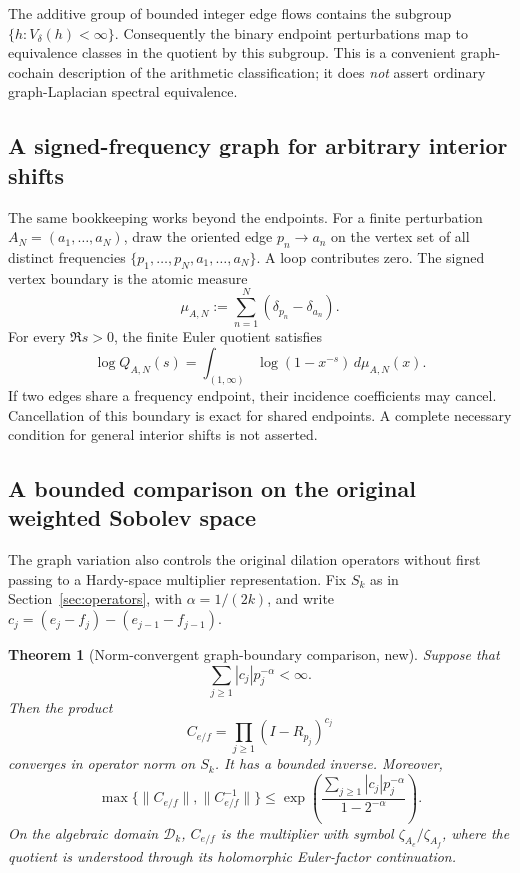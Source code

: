 \documentclass[12pt,letterpaper]{article}
\newtheorem{theorem}{Theorem}[section]
\theoremstyle{definition}
\theoremstyle{remark}
\begin{document}
The additive group of bounded integer edge flows contains the subgroup
\(\{h:V_\delta(h)<\infty\}\).
Consequently the binary endpoint perturbations map to equivalence
classes in the quotient by this subgroup.  This is a convenient
graph-cochain description of the arithmetic classification; it does
\emph{not} assert ordinary graph-Laplacian spectral equivalence.

\subsection{A signed-frequency graph for arbitrary interior shifts}

The same bookkeeping works beyond the endpoints.  For a finite
perturbation \(A_N=(a_1,\ldots,a_N)\), draw the oriented edge
\(p_n\to a_n\) on the vertex set of all distinct frequencies
\(\{p_1,\ldots,p_N,a_1,\ldots,a_N\}\).  A loop contributes zero.
The signed vertex boundary is the atomic measure
\[
 \mu_{A,N}:=\sum_{n=1}^N(\delta_{p_n}-\delta_{a_n}).
\]
For every \(\Re s>0\), the finite Euler quotient satisfies
\begin{equation}\label{eq:graph-atomic}
 \log Q_{A,N}(s)=
 \int_{(1,\infty)}\log(1-x^{-s})\,d\mu_{A,N}(x).
\end{equation}
If two edges share a frequency endpoint, their incidence
coefficients may cancel.  Cancellation of this boundary is exact for shared endpoints. A complete
necessary condition for general interior shifts is not asserted.


\subsection{A bounded comparison on the original weighted Sobolev space}

The graph variation also controls the original dilation operators
without first passing to a Hardy-space multiplier representation.
Fix $S_k$ as in Section~\ref{sec:operators}, with
$\alpha=1/(2k)$, and write
$c_j=(e_j-f_j)-(e_{j-1}-f_{j-1})$.

\begin{theorem}[Norm-convergent graph-boundary comparison, new]
\label{thm:graph-Sk}
Suppose that
\begin{equation}\label{eq:graph-Sk-hyp}
 \sum_{j\ge1}|c_j|p_j^{-\alpha}<\infty.
\end{equation}
Then the product
\begin{equation}\label{eq:graph-Sk-operator}
 C_{e/f}=\prod_{j\ge1}(I-R_{p_j})^{c_j}
\end{equation}
converges in operator norm on $S_k$. It has a bounded inverse.
Moreover,
\begin{equation}\label{eq:graph-Sk-bound}
 \max\{\|C_{e/f}\|,\|C_{e/f}^{-1}\|\}
 \le \exp\left(
 \frac{\sum_{j\ge1}|c_j|p_j^{-\alpha}}
 {1-2^{-\alpha}}\right).
\end{equation}
On the algebraic domain $\mathcal D_k$, $C_{e/f}$ is the
multiplier with symbol $\zeta_{A_e}/\zeta_{A_f}$,
where the quotient is understood through its holomorphic
Euler-factor continuation.
\end{theorem}
\end{document}
